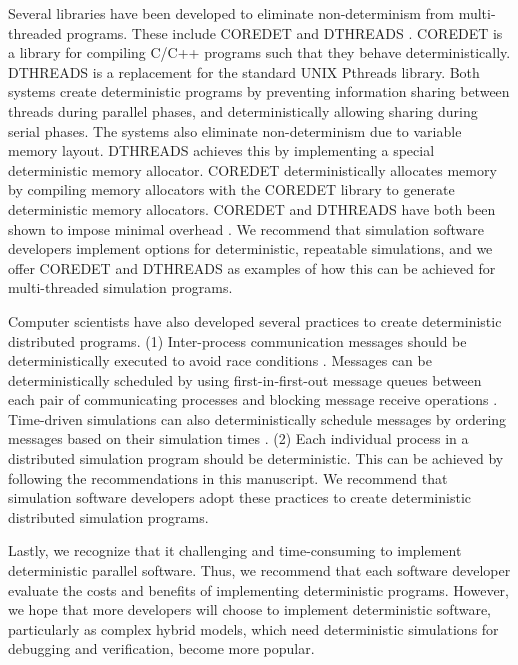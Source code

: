 \documentclass[journal,transmag,twoside]{IEEEtran}
\begin{document}
Several libraries have been developed to eliminate non-determinism from multi-threaded programs. These include C{\small ORE}D{\small ET} \cite{bergan2010coredet} and D{\small THREADS} \cite{liu2011dthreads}.
C{\small ORE}D{\small ET} is a library for compiling C/C++ programs such that they behave deterministically.
D{\small THREADS} is a replacement for the standard UNIX Pthreads library.
Both systems create deterministic programs by preventing information sharing between
threads during parallel phases, and deterministically allowing sharing during serial phases.
The systems also eliminate non-determinism due to variable memory layout. D{\small THREADS} achieves this by implementing a special deterministic memory allocator. 
C{\small ORE}D{\small ET} deterministically allocates memory by compiling memory allocators with the C{\small ORE}D{\small ET} library to generate deterministic memory allocators.
C{\small ORE}D{\small ET} and D{\small THREADS} have both been shown to impose minimal overhead \cite{liu2011dthreads}. We recommend that simulation software developers implement options for deterministic, repeatable simulations, and we offer C{\small ORE}D{\small ET} and D{\small THREADS} as examples of how this can be achieved for multi-threaded simulation programs.

Computer scientists have also developed several practices to create deterministic distributed programs. (1) Inter-process communication messages should be deterministically executed to avoid race conditions \cite{netzer1992race}. Messages can be deterministically scheduled by using first-in-first-out message queues between each pair of communicating processes and blocking message receive operations \cite{chandy1981asynchronous}. Time-driven simulations can also deterministically schedule messages by ordering messages based on their simulation times \cite{Jefferson1985}. (2) Each individual process in a distributed simulation program should be deterministic. This can be achieved by following the recommendations in this manuscript. We recommend that simulation software developers adopt these practices to create deterministic distributed simulation programs.

Lastly, we recognize that it challenging and time-consuming to implement deterministic parallel software. Thus, we recommend that each software developer evaluate the costs and benefits of implementing deterministic programs. However, we hope that more developers will choose to implement deterministic software, particularly as complex hybrid models, which need deterministic simulations for debugging and verification, become more popular.
\end{document}

